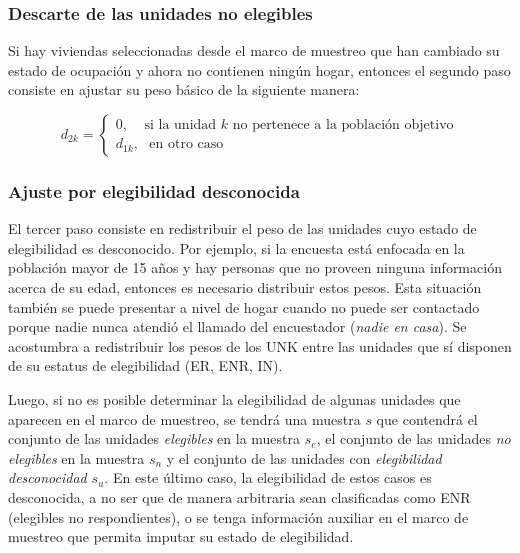 \documentclass[12pt,spanish,]{book}
\begin{document}
\hypertarget{descarte-de-las-unidades-no-elegibles}{%
\subsubsection*{Descarte de las unidades no elegibles}\label{descarte-de-las-unidades-no-elegibles}}

Si hay viviendas seleccionadas desde el marco de muestreo que han cambiado su estado de ocupación y ahora no contienen ningún hogar, entonces el segundo paso consiste en ajustar su peso básico de la siguiente manera:

\[
d_{2k} = 
\begin{cases}
0, \ \ \ \ \ \text{si la unidad $k$ no pertenece a la población objetivo}\\
d_{1k},\ \ \ \text{en otro caso }
\end{cases}
\]

\hypertarget{ajuste-por-elegibilidad-desconocida}{%
\subsubsection*{Ajuste por elegibilidad desconocida}\label{ajuste-por-elegibilidad-desconocida}}

El tercer paso consiste en redistribuir el peso de las unidades cuyo estado de elegibilidad es desconocido. Por ejemplo, si la encuesta está enfocada en la población mayor de 15 años y hay personas que no proveen ninguna información acerca de su edad, entonces es necesario distribuir estos pesos. Esta situación también se puede presentar a nivel de hogar cuando no puede ser contactado porque nadie nunca atendió el llamado del encuestador (\emph{nadie en casa}). Se acostumbra a redistribuir los pesos de los UNK entre las unidades que sí disponen de su estatus de elegibilidad (ER, ENR, IN).

Luego, si no es posible determinar la elegibilidad de algunas unidades que aparecen en el marco de muestreo, se tendrá una muestra \(s\) que contendrá el conjunto de las unidades \emph{elegibles} en la muestra \(s_{e}\), el conjunto de las unidades \emph{no elegibles} en la muestra \(s_{n}\) y el conjunto de las unidades con \emph{elegibilidad desconocidad} \(s_{u}\). En este último caso, la elegibilidad de estos casos es desconocida, a no ser que de manera arbitraria sean clasificadas como ENR (elegibles no respondientes), o se tenga información auxiliar en el marco de muestreo que permita imputar su estado de elegibilidad.
\end{document}
